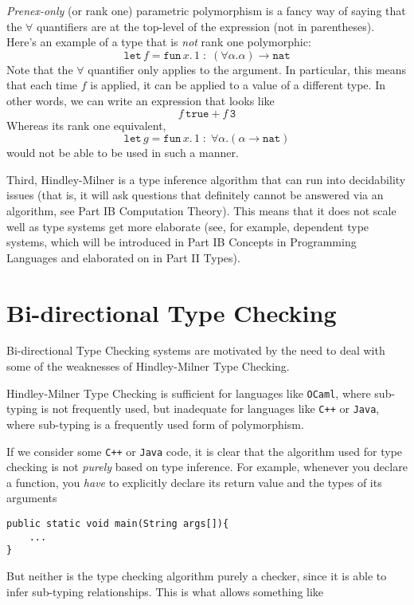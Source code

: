 {\textit{Prenex-only} (or rank one) parametric polymorphism is a fancy way of saying that the $\forall$ quantifiers are at the top-level of the expression (not in parentheses). Here's an example of a type that is \textit{not} rank one polymorphic:
\[\texttt{let} \,  f = \texttt{fun} \, x. \, 1 \; : \; (\forall \alpha. \alpha) \to \texttt{nat}\]
Note that the $\forall$ quantifier only applies to the argument. In particular, this means that each time $f$ is applied, it can be applied to a value of a different type. In other words, we can write an expression that looks like
\[f \, \texttt{true} + f \, \texttt{3}\]
Whereas its rank one equivalent, \[\texttt{let} \,  g = \texttt{fun} \, x. \, 1 \; : \; \forall \alpha. (\alpha \to \texttt{nat})\]
would not be able to be used in such a manner. 

Third, Hindley-Milner is a type inference algorithm that can run into decidability issues (that is, it will ask questions that definitely cannot be answered via an algorithm, see \textsf{Part IB Computation Theory}). This means that it does not scale well as type systems get more elaborate (see, for example, dependent type systems, which will be introduced in \textsf{Part IB Concepts in Programming Languages} and elaborated on in \textsf{Part II Types}).

\section{Bi-directional Type Checking\optional}\label{section:btc}
Bi-directional Type Checking systems are motivated by the need to deal with some of the weaknesses of Hindley-Milner Type Checking. 

Hindley-Milner Type Checking is sufficient for languages like \texttt{OCaml}, where sub-typing is not frequently used, but inadequate for languages like \texttt{C++} or \texttt{Java}, where sub-typing is a frequently used form of polymorphism. 

If we consider some \texttt{C++} or \texttt{Java} code, it is clear that the algorithm used for type checking is not \textit{purely} based on type inference. For example, whenever you declare a function, you \textit{have} to explicitly declare its return value and the types of its arguments

\begin{verbatim}
public static void main(String args[]){
    ...
}
\end{verbatim}
But neither is the type checking algorithm purely a checker, since it is able to infer sub-typing relationships. This is what allows something like

}
